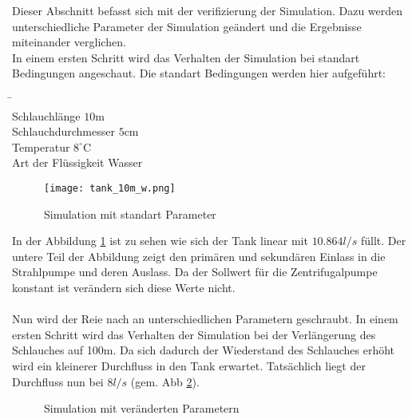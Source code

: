 Dieser Abschnitt befasst sich mit der verifizierung der Simulation. Dazu werden unterschiedliche Parameter der Simulation geändert und die Ergebnisse miteinander verglichen.\\
In einem ersten Schritt wird das Verhalten der Simulation bei standart Bedingungen angeschaut. Die standart Bedingungen werden hier aufgeführt:

\begin{tabbing}
\hspace{120mm}			\=  \hspace{10mm} \=	\\
Schlauchlänge			\> $10$m		\\
Schlauchdurchmesser		\> $5$cm		\\
Temperatur			\> $8^{\circ}$C		\\
Art der Flüssigkeit		\> Wasser	\> 		\\
\end{tabbing}

\begin{figure}[htb]
\texttt{[image: tank\_10m\_w.png]}
\caption{Simulation mit standart Parameter}
\label{fig:Simulation mit standart Parameter}
\end{figure}

In der Abbildung \ref{fig:Simulation mit standart Parameter} ist zu sehen wie sich der Tank linear mit $10.864 l/s$ füllt. Der untere Teil der Abbildung zeigt den primären und sekundären Einlass in die Strahlpumpe und deren Auslass. Da der Sollwert für die Zentrifugalpumpe konstant ist verändern sich diese Werte nicht.\\
\\
Nun wird der Reie nach an unterschiedlichen Parametern geschraubt. In einem ersten Schritt wird das Verhalten der Simulation bei der Verlängerung des Schlauches auf 100m. Da sich dadurch der Wiederstand des Schlauches erhöht wird ein kleinerer Durchfluss in den Tank erwartet. Tatsächlich liegt der Durchfluss nun bei $8 l/s$ (gem. Abb \ref{fig:Simulation mit veränderten Parametern}).
\clearpage

\begin{figure}[htb]
\caption{Simulation mit veränderten Parametern}
\label{fig:Simulation mit veränderten Parametern}
\end{figure}

